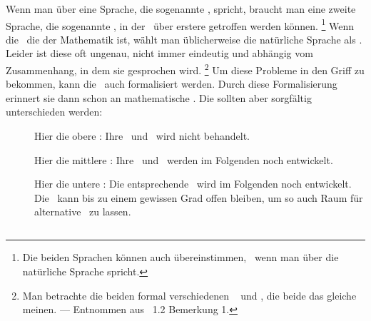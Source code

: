 Wenn man über eine Sprache, die sogenannte \Objektsprache, spricht, braucht man eine zweite Sprache, die sogenannte \Metasprache, in der \Aussagen\ über erstere getroffen werden können.%
\footnote{%
	Die beiden Sprachen können auch übereinstimmen, \textzB\ wenn man über die natürliche Sprache spricht.
}
Wenn die \Objektsprache\ die der Mathematik ist, wählt man üblicherweise die natürliche Sprache als \Metasprache.
Leider ist diese oft ungenau, nicht immer eindeutig und abhängig vom Zusammenhang, in dem sie gesprochen wird.%
\footnote{%
	Man betrachte die beiden formal verschiedenen \Aussagen\  und , die beide das gleiche meinen.
	--- Entnommen aus \cite{bib:Rautenberg} \sectionname~1.2 Bemerkung 1.
}
Um diese Probleme in den Griff zu bekommen, kann die \Metasprache\ auch formalisiert werden.
Durch diese Formalisierung erinnert sie dann schon an mathematische \Formeln.
Die  sollten aber sorgfältig unterschieden werden:
\begin{description}
	\item[] Hier die obere \Sprachebene: \MetaspracheDescription
	Ihre \Syntax\ und \Semantik\ wird nicht behandelt.

	\item[] Hier die mittlere \Sprachebene: \formaleMetaspracheDescription
	Ihre \Syntax\ und \Semantik\ werden im Folgenden noch entwickelt.

	\item[] Hier die untere \Sprachebene: \ObjektspracheDescription
	Die entsprechende \Syntax\ wird im Folgenden noch entwickelt.
	Die \Semantik\ kann bis zu einem gewissen Grad offen bleiben, um so auch Raum für alternative \Logiken\ zu lassen.
\end{description}

\subsection[Aussagen]{\Aussagen}%
\label  {sub:Aussagen}

